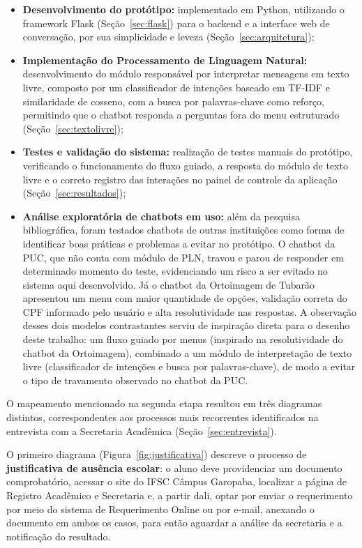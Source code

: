 \documentclass[12pt]{article}
\begin{document}
\begin{itemize}
  \item \textbf{Desenvolvimento do protótipo:} implementado em Python,
  utilizando o framework Flask (Seção~\ref{sec:flask}) para o backend e a interface
  web de conversação, por sua simplicidade e leveza (Seção~\ref{sec:arquitetura});

  \item \textbf{Implementação do Processamento de Linguagem Natural:}
  desenvolvimento do módulo responsável por interpretar mensagens em texto livre, composto por um classificador de intenções baseado em TF-IDF e similaridade de cosseno, com a busca por palavras-chave como reforço, permitindo que o chatbot responda a perguntas fora do menu estruturado (Seção~\ref{sec:textolivre});

  \item \textbf{Testes e validação do sistema:} realização de testes
  manuais do protótipo, verificando o funcionamento do fluxo guiado, a
  resposta do módulo de texto livre e o correto registro das interações
  no painel de controle da aplicação (Seção~\ref{sec:resultados});

  \item \textbf{Análise exploratória de chatbots em uso:} além da
  pesquisa bibliográfica, foram testados chatbots de outras instituições
  como forma de identificar boas práticas e problemas a evitar no
  protótipo. O chatbot da PUC, que não conta com módulo de PLN, travou e
  parou de responder em determinado momento do teste, evidenciando um
  risco a ser evitado no sistema aqui desenvolvido. Já o chatbot da
  Ortoimagem de Tubarão apresentou um menu com maior quantidade de
  opções, validação correta do CPF informado pelo usuário e alta
  resolutividade nas respostas. A observação desses dois modelos
  contrastantes serviu de inspiração direta para o desenho deste
  trabalho: um fluxo guiado por menus (inspirado na resolutividade do
  chatbot da Ortoimagem), combinado a um módulo de interpretação de texto livre (classificador de intenções e busca por palavras-chave), de modo a evitar o tipo de travamento
  observado no chatbot da PUC.
\end{itemize}

O mapeamento mencionado na segunda etapa resultou em três diagramas
distintos, correspondentes aos processos mais recorrentes identificados
na entrevista com a Secretaria Acadêmica (Seção~\ref{sec:entrevista}).

O primeiro diagrama (Figura~\ref{fig:justificativa}) descreve o processo de \textbf{justificativa de
ausência escolar}: o aluno deve providenciar um documento comprobatório,
acessar o site do IFSC Câmpus Garopaba, localizar a página de Registro
Acadêmico e Secretaria e, a partir dali, optar por enviar o requerimento
por meio do sistema de Requerimento Online ou por e-mail, anexando o
documento em ambos os casos, para então aguardar a análise da secretaria
e a notificação do resultado.
\end{document}
